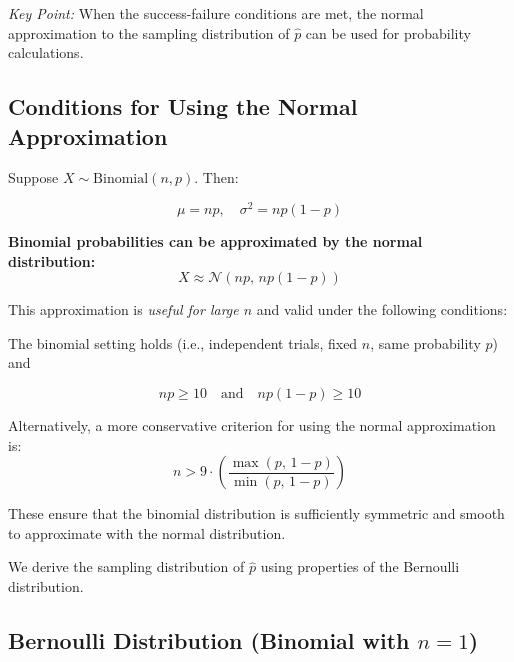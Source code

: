 \medskip

\textit{Key Point:} When the success-failure conditions are met, the normal approximation to the sampling distribution of \( \hat{p} \) can be used for probability calculations.
\subsection*{Conditions for Using the Normal Approximation}

\vspace{0.5em}

Suppose \( X \sim \text{Binomial}(n, p) \). Then:

\[
\mu = np, \quad \sigma^2 = np(1 - p)
\]

\medskip

\textbf{Binomial probabilities can be approximated by the normal distribution:}
\[
X \approx \mathcal{N}(np, \, np(1 - p))
\]

This approximation is \textit{useful for large \( n \)} and valid under the following conditions:

\begin{tcolorbox}[title=Standard Conditions,
  colback=blue!5, 
  colframe=blue!50!black, 
  coltitle=black,
  colbacktitle=blue!20, %
  fonttitle=\bfseries,
  sharp corners=south,
  boxrule=0.5pt,
  enhanced,
  width=\textwidth,
  breakable]
The binomial setting holds (i.e., independent trials, fixed \( n \), same probability \( p \)) and

\[
np \geq 10 \quad \text{and} \quad np(1 - p) \geq 10
\]
\end{tcolorbox}

\vspace{0.5em}

Alternatively, a more conservative criterion for using the normal approximation is:
\[
n > 9 \cdot \left( \frac{\max(p, \, 1 - p)}{\min(p, \, 1 - p)} \right)
\]

\medskip

These ensure that the binomial distribution is sufficiently symmetric and smooth to approximate with the normal distribution.

\medskip
We derive the sampling distribution of \( \hat{p} \) using properties of the Bernoulli distribution.

\subsection*{Bernoulli Distribution (Binomial with $n = 1$)}

